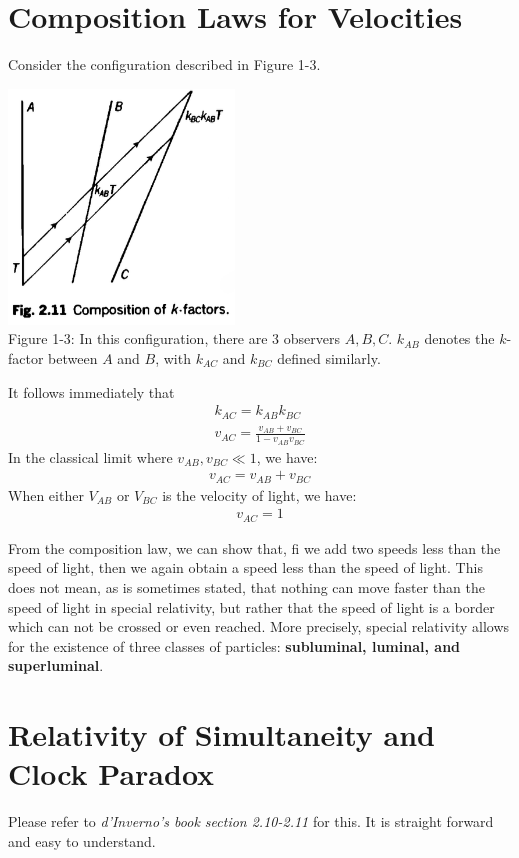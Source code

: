 \documentclass[9pt,oneside,headheight=10mm]{book}
\begin{document}
	\section{Composition Laws for Velocities}
	Consider the configuration described in Figure 1-3.
	\begin{center}
	\includegraphics[width=6cm]{Chap1/1-3}\\
	Figure 1-3: In this configuration, there are 3 observers $A,B,C$. $k_{AB}$ denotes the $k$-factor between $A$ and $B$, with $k_{AC}$ and $k_{BC}$ defined similarly. 
	\end{center}
	It follows immediately that	
	\begin{align*}
	k_{AC} = k_{AB}k_{BC}\\
	v_{AC} = \frac{v_{AB}+v_{BC}}{1-v_{AB}v_{BC}}
	\end{align*}
	In the classical limit where $v_{AB}, v_{BC}\ll 1$, we have:
	\begin{align*}
	v_{AC} = v_{AB}+v_{BC}
	\end{align*}
	When either $V_{AB}$ or $V_{BC}$ is the velocity of light, we have:
	\begin{align*}
	v_{AC} = 1
	\end{align*}
	
	
From the composition law, we can show that, fi we add two speeds less than the speed of light, then we again obtain a speed less than the speed of light. This does not mean, as is sometimes stated, that nothing can move faster than the speed of light in special relativity, but rather that the speed of light is a border which can not be crossed or even reached. More precisely, special relativity allows for the existence of three classes of particles: \textbf{subluminal, luminal, and superluminal}.

	\section{Relativity of Simultaneity and Clock Paradox}
	Please refer to \textit{d'Inverno's book section 2.10-2.11} for this. It is straight forward and easy to understand.
	
\end{document}

